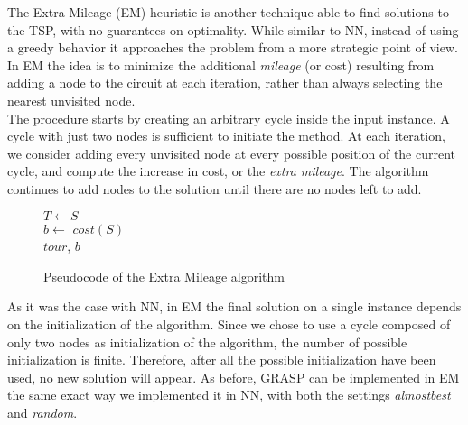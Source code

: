 The Extra Mileage (EM) heuristic is another technique able to find solutions to the TSP, with no guarantees on optimality.
While similar to NN, instead of using a greedy behavior it approaches the problem from a more strategic point of view. 
In EM the idea is to minimize the additional \textit{mileage} (or cost) resulting from adding a node to the circuit at each iteration, rather than always selecting the nearest unvisited node.\\
The procedure starts by creating an arbitrary cycle inside the input instance.
A cycle with just two nodes is sufficient to initiate the method.
At each iteration, we consider adding every unvisited node at every possible position of the current cycle, and compute the increase in cost, or the \textit{extra mileage}.
The algorithm continues to add nodes to the solution until there are no nodes left to add.
\\
\begin{figure}[htbp]
    \begin{algorithm}[H]
        \BlankLine
        $T \gets S$\\
        $b \gets$ $cost(S)$\\
        \Return $tour$, $b$\\
        
    \end{algorithm}
    \caption{Pseudocode of the Extra Mileage algorithm}
\end{figure}

As it was the case with NN, in EM the final solution on a single instance depends on the initialization of the algorithm.
Since we chose to use a cycle composed of only two nodes as initialization of the algorithm, the number of possible initialization is finite.
Therefore, after all the possible initialization have been used, no new solution will appear.
As before, GRASP can be implemented in EM the same exact way we implemented it in NN, with both the settings \textit{almostbest} and \textit{random}.

